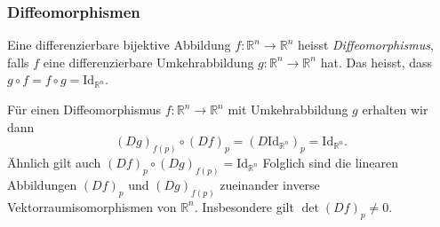 \documentclass[../main.tex]{subfiles}
\begin{document}
\subsubsection*{Diffeomorphismen}
\begin{definition}
  Eine differenzierbare bijektive Abbildung
  $f \colon \mathbb{R}^n \to \mathbb{R}^n$ 
  heisst \emph{Diffeomorphismus}, falls $f$ 
  eine differenzierbare Umkehrabbildung $g \colon \mathbb{R}^n \to \mathbb{R}^n$ 
  hat.
  Das heisst, dass $g \circ f = f \circ g = \text{Id}_{\mathbb{R}^n}$.
\end{definition}

Für einen Diffeomorphismus $f \colon \mathbb{R}^n \to \mathbb{R}^n$ 
mit Umkehrabbildung $g$ erhalten wir dann
\[
  {(Dg)}_{f(p)} \circ {(Df)}_p 
  = {(D \text{Id}_{\mathbb{R}^n})}_p = \text{Id}_{\mathbb{R}^n}.
\]
Ähnlich gilt auch ${(Df)}_p \circ {(Dg)}_{f(p)} = \text{Id}_{\mathbb{R}^n}$ 
Folglich sind die linearen Abbildungen
${(Df)}_p$ und ${(Dg)}_{f(p)}$ zueinander
inverse Vektorraumisomorphismen von $\mathbb{R}^n$.
Insbesondere gilt
$\det {(Df)}_p \neq 0$.
\end{document}
